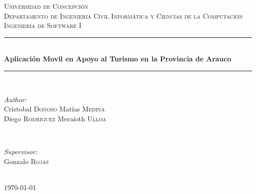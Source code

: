 \documentclass[12pt]{article}
\begin{document}
\begin{titlepage}

\newcommand{\HRule}{\rule{\linewidth}{0.5mm}} %

\center %
 

\textsc{\LARGE Universidad de Concepción}\\[1.5cm] %
\textsc{\Large Departamento de Ingeniería Civil Informática y Ciencias de la Computación}\\[0.5cm] %
\textsc{\large Ingeniería de Software I}\\[0.5cm] %


\HRule \\[0.4cm]
{ \huge \bfseries Aplicación Movil en Apoyo al Turismo en la Provincia de Arauco }\\[0.4cm] %
\HRule \\[1.5cm]
 

\begin{minipage}{0.4\textwidth}
\begin{flushleft} \large
\emph{Author:}\\
Cristobal \textsc{Donoso}
Matías \textsc{Medina}\\
Diego \textsc{Rodriguez}
Meraioth \textsc{Ulloa}
\end{flushleft}
\end{minipage}
~
\begin{minipage}{0.4\textwidth}
\begin{flushright} \large
\emph{Supervisor:} \\
Gonzalo \textsc{Rojas} %
\end{flushright}
\end{minipage}\\[4cm]

{\large \today}\\[3cm] %
\vfill %
\end{titlepage}
\end{document}
